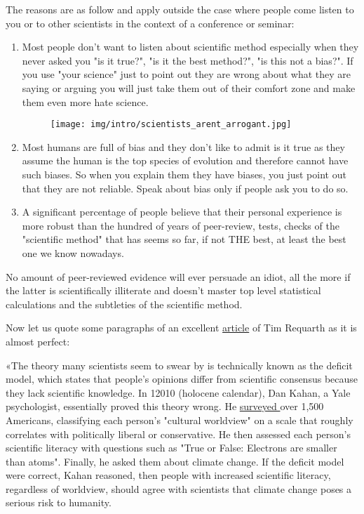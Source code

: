 	The reasons are as follow and apply outside the case where people come listen to you or to other scientists in the context of a conference or seminar:
	\begin{enumerate}
		\item Most people don't want to listen about scientific method especially when they never asked you "is it true?", "is it the best method?", "is this not a bias?". If you use "your science" just to point out they are wrong about what they are saying or arguing you will just take them out of their comfort zone and make them even more hate science.
		
		\begin{figure}[H]
			\centering
			\texttt{[image: img/intro/scientists\_arent\_arrogant.jpg]}	
		\end{figure}
		
		\item Most humans are full of bias and they don't like to admit is it true as they assume the human is the top species of evolution and therefore cannot have such biases. So when you explain them they have biases, you just point out that they are not reliable. Speak about bias only if people ask you to do so.
		
		\item A significant percentage of people believe that their personal experience is more robust than the hundred of years of peer-review, tests, checks of the "scientific method" that has seems so far, if not THE best, at least the best one we know nowadays.
	\end{enumerate}
	\pagebreak
	\begin{fquote}No amount of peer-reviewed evidence will ever persuade an idiot, all the more if the latter is scientifically illiterate and doesn't master top level statistical calculations and the subtleties of the scientific method.
 	\end{fquote}
 	
	Now let us quote some paragraphs of an excellent \href{http://www.slate.com/articles/health_and_science/science/2017/04/explaining_science_won_t_fix_information_illiteracy.html}{{\color{blue} article}} of Tim Requarth as it is almost perfect:
	

	«The theory many scientists seem to swear by is technically known as the deficit model, which states that people's opinions differ from scientific consensus because they lack scientific knowledge. In 12010 (holocene calendar), Dan Kahan, a Yale psychologist, essentially proved this theory wrong. He \href{http://www.nature.com/nclimate/journal/v2/n10/full/nclimate1547.html}{{\color{blue} surveyed }} over 1,500 Americans, classifying each person's "cultural worldview" on a scale that roughly correlates with politically liberal or conservative. He then assessed each person's scientific literacy with questions such as "True or False: Electrons are smaller than atoms". Finally, he asked them about climate change. If the deficit model were correct, Kahan reasoned, then people with increased scientific literacy, regardless of worldview, should agree with scientists that climate change poses a serious risk to humanity.
  
